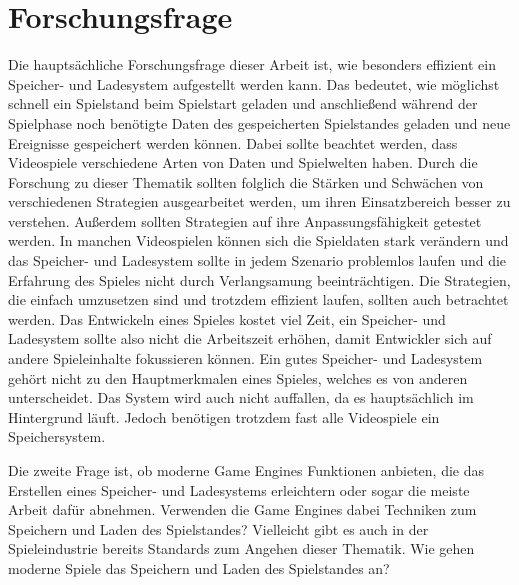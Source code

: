 \section{Forschungsfrage}
Die hauptsächliche Forschungsfrage dieser Arbeit ist, wie besonders effizient ein Speicher- und Ladesystem aufgestellt werden kann. Das bedeutet, wie möglichst schnell ein Spielstand beim Spielstart geladen und anschließend während der Spielphase noch benötigte Daten des gespeicherten Spielstandes geladen und neue Ereignisse gespeichert werden können. Dabei sollte beachtet werden, dass Videospiele verschiedene Arten von Daten und Spielwelten haben. Durch die Forschung zu dieser Thematik sollten folglich die Stärken und Schwächen von verschiedenen Strategien ausgearbeitet werden, um ihren Einsatzbereich besser zu verstehen. Außerdem sollten Strategien auf ihre Anpassungsfähigkeit getestet werden. In manchen Videospielen können sich die Spieldaten stark verändern und das Speicher- und Ladesystem sollte in jedem Szenario problemlos laufen und die Erfahrung des Spieles nicht durch Verlangsamung beeinträchtigen. Die Strategien, die einfach umzusetzen sind und trotzdem effizient laufen, sollten auch betrachtet werden. Das Entwickeln eines Spieles kostet viel Zeit, ein Speicher- und Ladesystem sollte also nicht die Arbeitszeit erhöhen, damit Entwickler sich auf andere Spieleinhalte fokussieren können. Ein gutes Speicher- und Ladesystem gehört nicht zu den Hauptmerkmalen eines Spieles, welches es von anderen unterscheidet. Das System wird auch nicht auffallen, da es hauptsächlich im Hintergrund läuft. Jedoch benötigen trotzdem fast alle Videospiele ein Speichersystem.  

Die zweite Frage ist, ob moderne Game Engines Funktionen anbieten, die das Erstellen eines Speicher- und Ladesystems erleichtern oder sogar die meiste Arbeit dafür abnehmen. Verwenden die Game Engines dabei Techniken zum Speichern und Laden des Spielstandes? Vielleicht gibt es auch in der Spieleindustrie bereits Standards zum Angehen dieser Thematik. Wie gehen moderne Spiele das Speichern und Laden des Spielstandes an?
